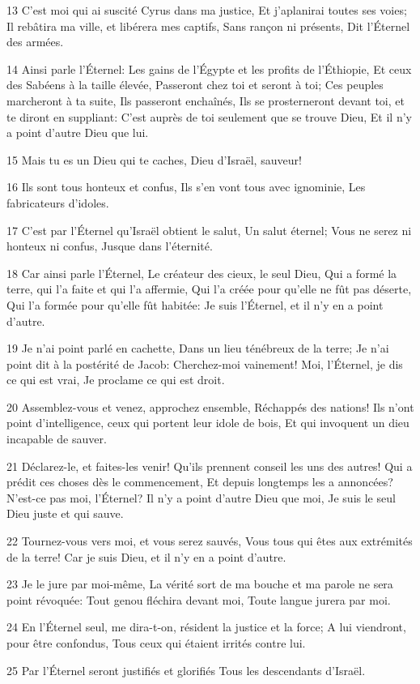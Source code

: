 \par 13 C'est moi qui ai suscité Cyrus dans ma justice, Et j'aplanirai toutes ses voies; Il rebâtira ma ville, et libérera mes captifs, Sans rançon ni présents, Dit l'Éternel des armées.
\par 14 Ainsi parle l'Éternel: Les gains de l'Égypte et les profits de l'Éthiopie, Et ceux des Sabéens à la taille élevée, Passeront chez toi et seront à toi; Ces peuples marcheront à ta suite, Ils passeront enchaînés, Ils se prosterneront devant toi, et te diront en suppliant: C'est auprès de toi seulement que se trouve Dieu, Et il n'y a point d'autre Dieu que lui.
\par 15 Mais tu es un Dieu qui te caches, Dieu d'Israël, sauveur!
\par 16 Ils sont tous honteux et confus, Ils s'en vont tous avec ignominie, Les fabricateurs d'idoles.
\par 17 C'est par l'Éternel qu'Israël obtient le salut, Un salut éternel; Vous ne serez ni honteux ni confus, Jusque dans l'éternité.
\par 18 Car ainsi parle l'Éternel, Le créateur des cieux, le seul Dieu, Qui a formé la terre, qui l'a faite et qui l'a affermie, Qui l'a créée pour qu'elle ne fût pas déserte, Qui l'a formée pour qu'elle fût habitée: Je suis l'Éternel, et il n'y en a point d'autre.
\par 19 Je n'ai point parlé en cachette, Dans un lieu ténébreux de la terre; Je n'ai point dit à la postérité de Jacob: Cherchez-moi vainement! Moi, l'Éternel, je dis ce qui est vrai, Je proclame ce qui est droit.
\par 20 Assemblez-vous et venez, approchez ensemble, Réchappés des nations! Ils n'ont point d'intelligence, ceux qui portent leur idole de bois, Et qui invoquent un dieu incapable de sauver.
\par 21 Déclarez-le, et faites-les venir! Qu'ils prennent conseil les uns des autres! Qui a prédit ces choses dès le commencement, Et depuis longtemps les a annoncées? N'est-ce pas moi, l'Éternel? Il n'y a point d'autre Dieu que moi, Je suis le seul Dieu juste et qui sauve.
\par 22 Tournez-vous vers moi, et vous serez sauvés, Vous tous qui êtes aux extrémités de la terre! Car je suis Dieu, et il n'y en a point d'autre.
\par 23 Je le jure par moi-même, La vérité sort de ma bouche et ma parole ne sera point révoquée: Tout genou fléchira devant moi, Toute langue jurera par moi.
\par 24 En l'Éternel seul, me dira-t-on, résident la justice et la force; A lui viendront, pour être confondus, Tous ceux qui étaient irrités contre lui.
\par 25 Par l'Éternel seront justifiés et glorifiés Tous les descendants d'Israël.

